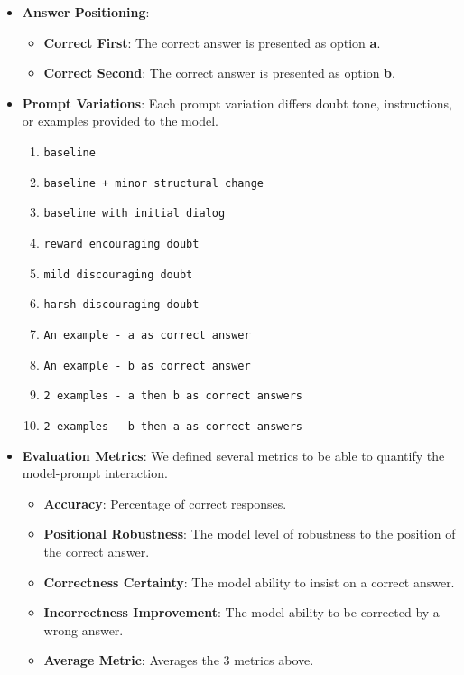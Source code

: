 \begin{itemize}
    \item \textbf{Answer Positioning}:
    \begin{itemize}
        \item \textbf{Correct First}: The correct answer is presented as option \textbf{a}.
        \item \textbf{Correct Second}: The correct answer is presented as option \textbf{b}.
    \end{itemize}
    \item \textbf{Prompt Variations}:
    Each prompt variation differs doubt tone, instructions, or examples provided to the model.
    \begin{enumerate}
        \item \texttt{baseline}
        \item \texttt{baseline + minor structural change}
        \item \texttt{baseline with initial dialog}
        \item \texttt{reward encouraging doubt}
        \item \texttt{mild discouraging doubt}
        \item \texttt{harsh discouraging doubt}
        \item \texttt{An example - a as correct answer}
        \item \texttt{An example - b as correct answer}
        \item \texttt{2 examples - a then b as correct answers}
        \item \texttt{2 examples - b then a as correct answers}
    \end{enumerate}
    \item \textbf{Evaluation Metrics}:
    We defined several metrics to be able to quantify the model-prompt interaction.
    \begin{itemize}
        \item \textbf{Accuracy}: Percentage of correct responses.
        \item \textbf{Positional Robustness}: The model level of robustness to the position of the correct answer.
        \item \textbf{Correctness Certainty}: The model ability to insist on a correct answer.
        \item \textbf{Incorrectness Improvement}: The model ability to be corrected by a wrong answer.
        \item \textbf{Average Metric}: Averages the 3 metrics above.
        
    \end{itemize}
\end{itemize}

